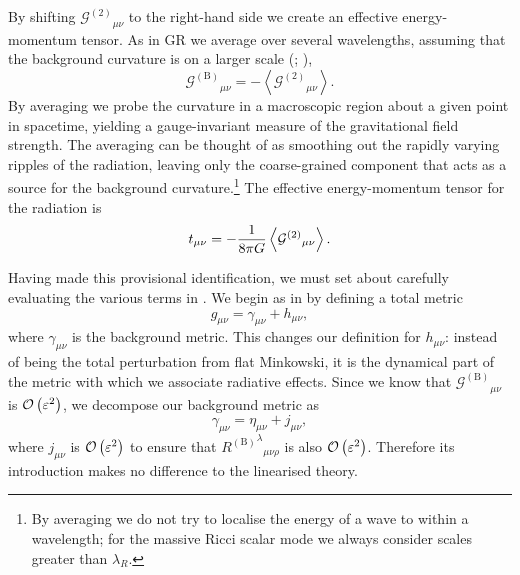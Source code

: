 By shifting ${\mathcal{G}^{(2)}}_{\mu\nu}$ to the right-hand side we create an effective energy-momentum tensor. As in GR we average over several wavelengths, assuming that the background curvature is on a larger scale (\citealt[section 35.13]{Misner1973}; \citealt{Stein2011}),
\begin{equation}
{\mathcal{G}^{(\text{B})}}_{\mu\nu} = -\left\langle{\mathcal{G}^{(2)}}_{\mu\nu}\right\rangle.
\end{equation}
By averaging we probe the curvature in a macroscopic region about a given point in spacetime, yielding a gauge-invariant measure of the gravitational field strength. The averaging can be thought of as smoothing out the rapidly varying ripples of the radiation, leaving only the coarse-grained component that acts as a source for the background curvature.\footnote{By averaging we do not try to localise the energy of a wave to within a wavelength; for the massive Ricci scalar mode we always consider scales greater than $\lambda_R$.} The effective energy-momentum tensor for the radiation is
\begin{equation}
t_{\mu\nu} = -\frac{1}{8\pi G}\left\langle{\mathcal{G}^{(\text{2})}}_{\mu\nu}\right\rangle.
\end{equation}

Having made this provisional identification, we must set about carefully evaluating the various terms in . We begin as in  by defining a total metric
\begin{equation}
g_{\mu\nu} = \gamma_{\mu\nu} + h_{\mu\nu},
\end{equation}
where $\gamma_{\mu\nu}$ is the background metric. This changes our definition for $h_{\mu\nu}$: instead of being the total perturbation from flat Minkowski, it is the dynamical part of the metric with which we associate radiative effects. Since we know that ${\mathcal{G}^{(\text{B})}}_{\mu\nu}$ is $\mathcal{O}\left({\varepsilon^2}\right)$, we decompose our background metric as
\begin{equation}
\gamma_{\mu\nu} = \eta_{\mu\nu} + j_{\mu\nu},
\end{equation}
where $j_{\mu\nu}$ is $\mathcal{O}\left({\varepsilon^2}\right)$ to ensure that ${{R^{(\text{B})}}^\lambda}_{\mu\nu\rho}$ is also $\mathcal{O}\left({\varepsilon^2}\right)$. Therefore its introduction makes no difference to the linearised theory.

